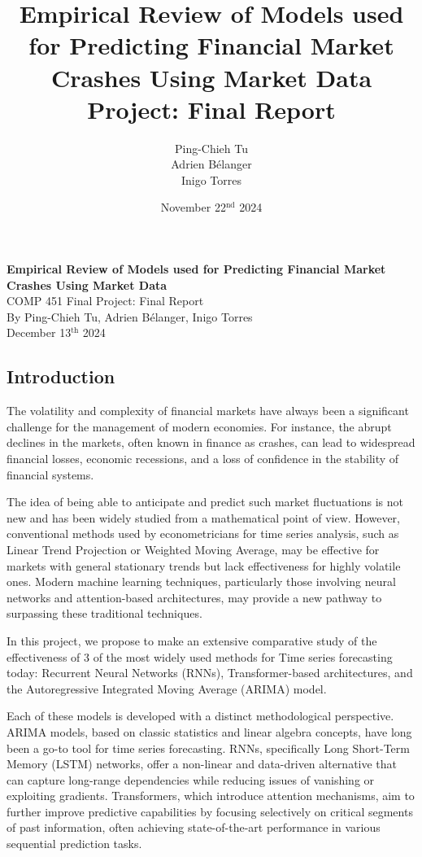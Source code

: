 \documentclass[12pt, letterpaper]{article}
\title{
    Empirical Review of Models used for Predicting Financial Market Crashes Using Market Data 
    \vspace{1em} \\
    {\large Project: Final Report}
}
\author{\normalsize Ping-Chieh Tu \\ Adrien Bélanger \\ Inigo Torres}
\date{\vspace{2em} November 22$^{\text{nd}}$ 2024}
\begin{document}
\begin{titlepage}
    \centering
    \vspace*{2in}
    {\LARGE \textbf{Empirical Review of Models used for Predicting Financial Market Crashes Using Market Data}}\\
    \vspace*{0.5in}
    {\large COMP 451 Final Project: Final Report}\\[4in]
    \normalsize
    By Ping-Chieh Tu, Adrien Bélanger, Inigo Torres \\ [3em]
    December 13$^{\text{th}}$ 2024
\end{titlepage}
\pagebreak

\subsection*{Introduction}

The volatility and complexity of financial markets have always been a significant challenge for the management of modern economies. 
For instance, the abrupt declines in the markets, often known in finance as crashes, can lead to widespread financial losses, economic recessions, and a loss of confidence in the stability of financial systems. 

The idea of being able to anticipate and predict such market fluctuations is not new and has been widely studied from a mathematical point of view. 
However, conventional methods used by econometricians for time series analysis, such as Linear Trend Projection or Weighted Moving Average, may be effective for markets with general stationary trends but lack effectiveness for highly volatile ones. 
Modern machine learning techniques, particularly those involving neural networks and attention-based architectures, may provide a new pathway to surpassing these traditional techniques.

In this project, we propose to make an extensive comparative study of the effectiveness of 3 of the most widely used methods for Time series forecasting today: Recurrent Neural Networks (RNNs), Transformer-based architectures, and the Autoregressive Integrated Moving Average (ARIMA) model. 

Each of these models is developed with a distinct methodological perspective. 
ARIMA models, based on classic statistics and linear algebra concepts, have long been a go-to tool for time series forecasting. 
RNNs, specifically Long Short-Term Memory (LSTM) networks, offer a non-linear and data-driven alternative that can capture long-range dependencies while reducing issues of vanishing or exploiting gradients. 
Transformers, which introduce attention mechanisms, aim to further improve predictive capabilities by focusing selectively on critical segments of past information, often achieving state-of-the-art performance in various sequential prediction tasks.
\end{document}

